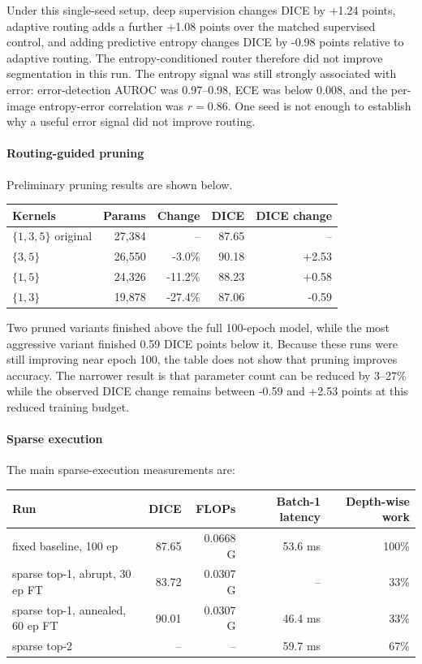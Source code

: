 \documentclass[10pt,a4paper]{article}
\begin{document}
Under this single-seed setup, deep supervision changes DICE by +1.24 points, adaptive routing adds a further +1.08 points over the matched supervised control, and adding predictive entropy changes DICE by -0.98 points relative to adaptive routing. The entropy-conditioned router therefore did not improve segmentation in this run. The entropy signal was still strongly associated with error: error-detection AUROC was 0.97--0.98, ECE was below 0.008, and the per-image entropy-error correlation was $r=0.86$. One seed is not enough to establish why a useful error signal did not improve routing.

\paragraph{Routing-guided pruning} Preliminary pruning results are shown below.

\begin{center}\small
\begin{tabular}{@{}lrrrr@{}}
\toprule
Kernels & Params & Change & DICE & DICE change \\
\midrule
$\{1,3,5\}$ original & 27{,}384 & -- & 87.65 & -- \\
$\{3,5\}$ & 26{,}550 & -3.0\% & 90.18 & +2.53 \\
$\{1,5\}$ & 24{,}326 & -11.2\% & 88.23 & +0.58 \\
$\{1,3\}$ & 19{,}878 & -27.4\% & 87.06 & -0.59 \\
\bottomrule
\end{tabular}
\end{center}

Two pruned variants finished above the full 100-epoch model, while the most aggressive variant finished 0.59 DICE points below it. Because these runs were still improving near epoch 100, the table does not show that pruning improves accuracy. The narrower result is that parameter count can be reduced by 3--27\% while the observed DICE change remains between -0.59 and +2.53 points at this reduced training budget.

\paragraph{Sparse execution} The main sparse-execution measurements are:

\begin{center}\small
\begin{tabular}{@{}lrrrr@{}}
\toprule
Run & DICE & FLOPs & Batch-1 latency & Depth-wise work \\
\midrule
fixed baseline, 100 ep & 87.65 & 0.0668 G & 53.6 ms & 100\% \\
sparse top-1, abrupt, 30 ep FT & 83.72 & 0.0307 G & -- & 33\% \\
sparse top-1, annealed, 60 ep FT & 90.01 & 0.0307 G & 46.4 ms & 33\% \\
sparse top-2 & -- & -- & 59.7 ms & 67\% \\
\bottomrule
\end{tabular}
\end{center}
\end{document}
